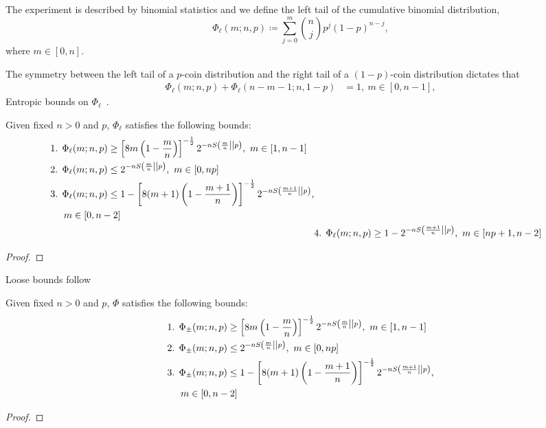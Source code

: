 \iffalse %
The experiment is described by binomial statistics and we define the left tail of the cumulative binomial distribution,
\begin{equation}\label{eq:phil}
	\Phi_\ell(m; n, p) \coloneqq \sum\limits_{j=0}^m \binom{n}{j} p^j (1-p)^{n-j},
\end{equation}
where $m\in [0,n]$. 

The symmetry between the left tail of a $p$-coin distribution and the right tail of a $(1-p)$-coin distribution dictates that
\begin{align}\label{eq:phi_reverse}
	\Phi_\ell(m; n, p) + \Phi_\ell(n-m-1; n, 1-p) &= 1,\ m\in [0,n-1],
\end{align}
Entropic bounds on $\Phi_\ell$~\cite{cit:ash}.
\begin{lemma}\label{lem:phil_bounds}
	Given fixed $n>0$ and $p$, $\Phi_\ell$ satisfies the following bounds:
	\begin{align*}
		\begin{split}
		&\text{1. } \Phi_\ell(m; n, p) \geq \left[ 8m\left(1-\frac{m}{n}\right) \right]^{-\frac{1}{2}} 2^{-n{S\left( \frac{m}{n} \middle\vert\middle\vert p \right)}},\ m\in [1,n-1] \\
		&\text{2. } \Phi_\ell(m; n, p) \leq 2^{-n{S\left( \frac{m}{n} \middle\vert\middle\vert p \right)}},\ m\in [0,np] \\
		&\text{3. } \Phi_\ell(m; n, p) \leq 1 - \left[ 8(m+1)\left(1-\frac{m+1}{n}\right) \right]^{-\frac{1}{2}} 2^{-nS\left( \frac{m+1}{n} \middle\vert\middle\vert p \right)}, \\
		&\hspace{14pt} m\in [0,n-2]
		\end{split}
		\\
		&\text{4. } \Phi_\ell(m; n, p) \geq 1 - 2^{-nS\left( \frac{m+1}{n} \middle\vert\middle\vert p \right)},\ m\in [np+1,n-2]
	\end{align*}
\end{lemma}
\begin{proof}
\end{proof}
Loose bounds follow
\begin{lemma}\label{lem:bounds_loose}
	Given fixed $n>0$ and $p$, $\Phi$ satisfies the following bounds:
	\begin{align*}
		\begin{split}
		&\text{1. } \Phi_{\pm}(m; n, p) \geq \left[ 8m\left(1-\frac{m}{n}\right) \right]^{-\frac{1}{2}} 2^{-n{S\left( \frac{m}{n} \middle\vert\middle\vert p \right)}},\ m\in [1,n-1] \\
		&\text{2. } \Phi_{\pm}(m; n, p) \leq 2^{-n{S\left( \frac{m}{n} \middle\vert\middle\vert p \right)}},\ m\in [0,np] \\
		&\text{3. } \Phi_{\pm}(m; n, p) \leq 1 - \left[ 8(m+1)\left(1-\frac{m+1}{n}\right) \right]^{-\frac{1}{2}} 2^{-nS\left( \frac{m+1}{n} \middle\vert\middle\vert p \right)}, \\
		&\hspace{14pt} m\in [0,n-2]
		\end{split}
	\end{align*}
\end{lemma}
\begin{proof}
\end{proof}

